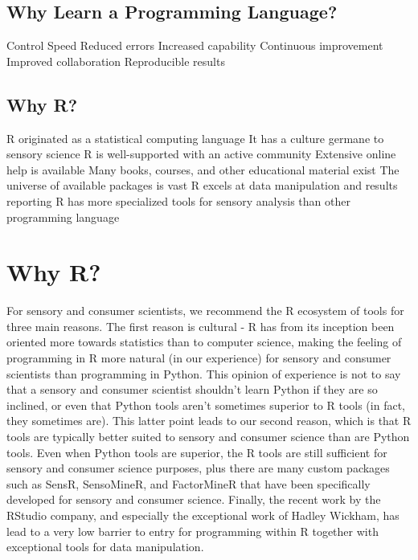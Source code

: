 \documentclass[
]{book}
\begin{document}
\hypertarget{why-learn-a-programming-language}{%
\subsection{Why Learn a Programming Language?}\label{why-learn-a-programming-language}}

Control
Speed
Reduced errors
Increased capability
Continuous improvement
Improved collaboration
Reproducible results

\hypertarget{why-r}{%
\subsection{Why R?}\label{why-r}}

R originated as a statistical computing language
It has a culture germane to sensory science
R is well-supported with an active community
Extensive online help is available
Many books, courses, and other educational material exist
The universe of available packages is vast
R excels at data manipulation and results reporting
R has more specialized tools for sensory analysis than other programming language

\hypertarget{why-r-1}{%
\section{Why R?}\label{why-r-1}}

For sensory and consumer scientists, we recommend the R ecosystem of tools for three main reasons. The first reason is cultural - R has from its inception been oriented more towards statistics than to computer science, making the feeling of programming in R more natural (in our experience) for sensory and consumer scientists than programming in Python. This opinion of experience is not to say that a sensory and consumer scientist shouldn't learn Python if they are so inclined, or even that Python tools aren't sometimes superior to R tools (in fact, they sometimes are). This latter point leads to our second reason, which is that R tools are typically better suited to sensory and consumer science than are Python tools. Even when Python tools are superior, the R tools are still sufficient for sensory and consumer science purposes, plus there are many custom packages such as SensR, SensoMineR, and FactorMineR that have been specifically developed for sensory and consumer science. Finally, the recent work by the RStudio company, and especially the exceptional work of Hadley Wickham, has lead to a very low barrier to entry for programming within R together with exceptional tools for data manipulation.
\end{document}
